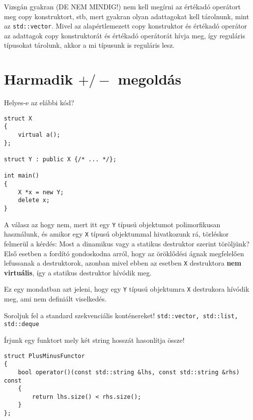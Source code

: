 \documentclass[a4paper,11.5pt]{article}
\begin{document}
	\medskip
	Vizsgán gyakran (DE NEM MINDIG!) nem kell megírni az értékadó operátort meg copy konstruktort, stb, mert gyakran olyan adattagokat kell tárolnunk, mint az \texttt{std::vector}. Mivel az alapértlemezett copy konstruktor és értékadó operátor az adattagok copy konstruktorát és értékadó operátorát hívja meg, így reguláris típusokat tárolunk, akkor a mi típusunk is reguláris lesz.
	\section{Harmadik $+/-$ megoldás}
	Helyes-e az elábbi kód?
		
	\begin{lstlisting}
struct X
{
	virtual a();
};

struct Y : public X {/* ... */};

int main()
{
	X *x = new Y;
	delete x;
}
	\end{lstlisting}
		
	A válasz az hogy nem, mert itt egy \texttt{Y} típusú objektumot polimorfikusan használunk, és amikor egy \texttt{X} típusú objektummal hivatkozunk rá, törléskor felmerül a kérdés: Most a dinamikus vagy a statikus destruktor szerint töröljünk? Első esetben a fordító gondoskodna arról, hogy az öröklődési ágnak megfelelően lefussanak a destruktorok, azonban mivel ebben az esetben \texttt{X} destruktora \textbf{nem virtuális}, így a statikus destruktor hívódik meg. 
	
	Ez egy mondatban azt jeleni, hogy egy \texttt{Y} típusú objektumra \texttt{X} destrukora hívódik meg, ami nem definiált viselkedés.
	\bigskip
	
	Soroljuk fel a standard szekvenciális konténereket! \texttt{std::vector, std::list, std::deque}
	\bigskip
	
	 Írjunk egy funktort mely két string hosszát hasonlítja össze!
	\begin{lstlisting}
struct PlusMinusFunctor
{
	bool operator()(const std::string &lhs, const std::string &rhs) const
	{
		return lhs.size() < rhs.size();
	}
};
		\end{lstlisting}
\end{document}
